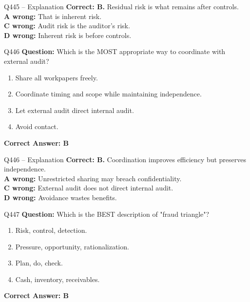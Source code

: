 \documentclass[aspectratio=169,10pt]{beamer}
\begin{document}
	\begin{frame}[t]{Q445 -- Explanation}
		\small
		\textbf{Correct: B.} Residual risk is what remains after controls. \\[4pt]
		\textbf{A wrong:} That is inherent risk. \\[2pt]
		\textbf{C wrong:} Audit risk is the auditor's risk. \\[2pt]
		\textbf{D wrong:} Inherent risk is before controls.
	\end{frame}
	
	\begin{frame}[t]{Q446}
		\small
		\textbf{Question:} Which is the MOST appropriate way to coordinate with external audit?
		\begin{enumerate}[label=\Alph*.,itemsep=1pt,topsep=2pt]
			\item Share all workpapers freely.
			\item Coordinate timing and scope while maintaining independence.
			\item Let external audit direct internal audit.
			\item Avoid contact.
		\end{enumerate}
		\vspace{4pt}
		\textbf{Correct Answer: B}
	\end{frame}
	
	\begin{frame}[t]{Q446 -- Explanation}
		\small
		\textbf{Correct: B.} Coordination improves efficiency but preserves independence. \\[4pt]
		\textbf{A wrong:} Unrestricted sharing may breach confidentiality. \\[2pt]
		\textbf{C wrong:} External audit does not direct internal audit. \\[2pt]
		\textbf{D wrong:} Avoidance wastes benefits.
	\end{frame}
	
	\begin{frame}[t]{Q447}
		\small
		\textbf{Question:} Which is the BEST description of "fraud triangle"?
		\begin{enumerate}[label=\Alph*.,itemsep=1pt,topsep=2pt]
			\item Risk, control, detection.
			\item Pressure, opportunity, rationalization.
			\item Plan, do, check.
			\item Cash, inventory, receivables.
		\end{enumerate}
		\vspace{4pt}
		\textbf{Correct Answer: B}
	\end{frame}
	
\end{document}

